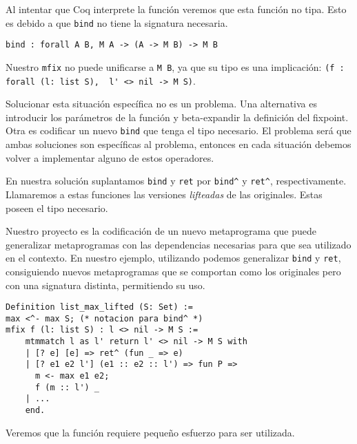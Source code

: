 Al intentar que Coq interprete la función veremos que esta función no tipa.
Esto es debido a que \lstinline{bind} no tiene la signatura necesaria.

\begin{lstlisting}
bind : forall A B, M A -> (A -> M B) -> M B
\end{lstlisting}

Nuestro \lstinline{mfix} no puede unificarse a \lstinline{M B}, ya que su tipo es una implicación: \lstinline{(f : forall (l: list S),  l' <> nil -> M S)}.

Solucionar esta situación específica no es un problema.
Una alternativa es introducir los parámetros de la función y beta-expandir la definición del fixpoint.
Otra es codificar un nuevo \lstinline{bind} que tenga el tipo necesario.
El problema será que ambas soluciones son específicas al problema, entonces en cada situación debemos volver a implementar alguno de estos operadores.

En nuestra solución suplantamos \lstinline{bind} y \lstinline{ret} por \lstinline{bind^} y \lstinline{ret^}, respectivamente. Llamaremos a estas funciones las versiones \emph{lifteadas} de las originales. Estas poseen el tipo necesario.

Nuestro proyecto es la codificación de un nuevo metaprograma \lift que puede generalizar metaprogramas con las dependencias necesarias para que sea utilizado en el contexto.
En nuestro ejemplo, utilizando \lift podemos generalizar \lstinline{bind} y \lstinline{ret}, consiguiendo nuevos metaprogramas que se comportan como los originales pero con una signatura distinta, permitiendo su uso.

\begin{lstlisting}[frame=tb,caption={Función \lstinline{list_max} lifteada},label=lst:list_max_lifted]
Definition list_max_lifted (S: Set) :=
max <^- max S; (* notacion para bind^ *)
mfix f (l: list S) : l <> nil -> M S :=
    mtmmatch l as l' return l' <> nil -> M S with
    | [? e] [e] => ret^ (fun _ => e)
    | [? e1 e2 l'] (e1 :: e2 :: l') => fun P =>
      m <- max e1 e2;
      f (m :: l') _
    | ...
    end.
\end{lstlisting}

Veremos que la función \lift requiere pequeño esfuerzo para ser utilizada.